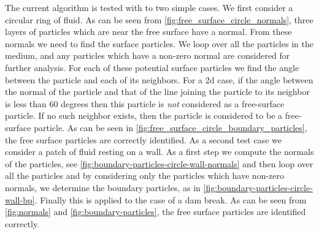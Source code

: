 The current algorithm is tested with to two simple cases. We first consider a
circular ring of fluid. As can be seen from
\cref{fig:free_surface_circle_normals}, three layers of particles which are
near the free surface have a normal. From these normals we need to find the
surface particles. We loop over all the particles in the medium, and any
particles which have a non-zero normal are considered for further analysis.
For each of these potential surface particles we find the angle between the
particle and each of its neighbors. For a 2d case, if the angle between the
normal of the particle and that of the line joining the particle to its
neighbor is less than 60 degrees then this particle is \emph{not} considered
as a free-surface particle. If no such neighbor exists, then the particle is
considered to be a free-surface particle. As can be seen in
\cref{fig:free_surface_circle_boundary_particles}, the free surface particles
are correctly identified. As a second test case we consider a patch of fluid
resting on a wall. As a first step we compute the normals of the particles,
see \cref{fig:boundary-particles-circle-wall-normals} and then loop over all
the particles and by considering only the particles which have non-zero
normals, we determine the boundary particles, as in
\cref{fig:boundary-particles-circle-wall-bp}. Finally this is applied to the
case of a dam break. As can be seen from \cref{fig:normals} and
\cref{fig:boundary-particles}, the free surface particles are identified
correctly.
